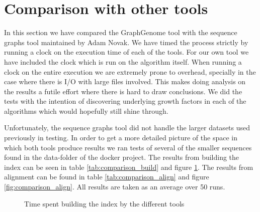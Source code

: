 \documentclass[thesis.tex]{subfiles}
\begin{document}
\section{Comparison with other tools}
\label{sec:comparison_tools}
In this section we have compared the GraphGenome tool with the sequence graphs tool maintained by Adam Novak. We have timed the process strictly by running a clock on the execution time of each of the tools. For our own tool we have included the clock which is run on the algorithm itself. When running a clock on the entire execution we are extremely prone to overhead, specially in the case where there is I/O with large files involved. This makes doing analysis on the results a futile effort where there is hard to draw conclusions. We did the tests with the intention of discovering underlying growth factors in each of the algorithms which would hopefully still shine through.\\
\par\noindent
Unfortunately, the sequence graphs tool did not handle the larger datasets used previously in testing. In order to get a more detailed picture of the space in which both tools produce results we ran tests of several of the smaller sequences found in the data-folder of the docker project. The results from building the index can be seen in table \ref{tab:comparison_build} and figure \ref{fig:comparison_build}. The results from alignment can be found in table \ref{tab:comparison_align} and figure \ref{fig:comparison_align}. All results are taken as an average over 50 runs.
\begin{figure}
  \caption{Time spent building the index by the different tools}
  \label{fig:comparison_build}
\end{figure}
\end{document}
